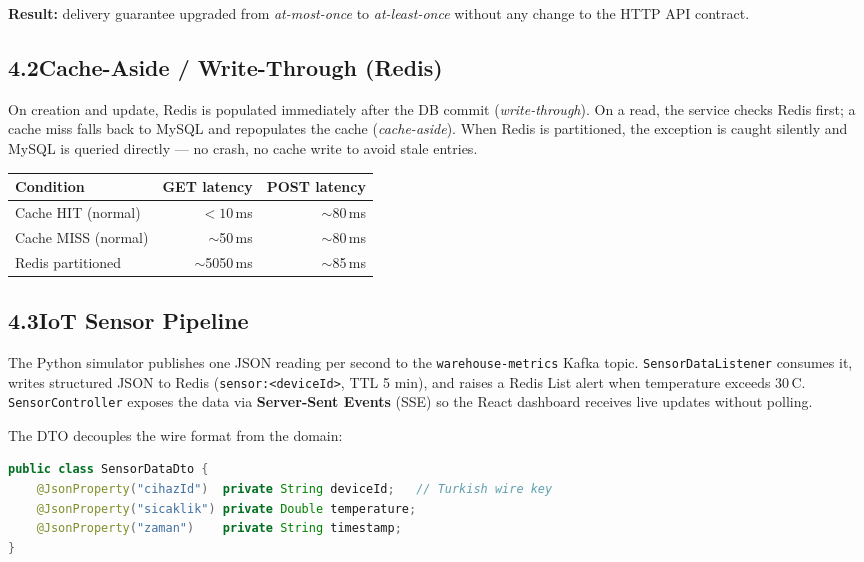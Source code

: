 \documentclass[11pt,a4paper]{article}
\begin{document}
\smallskip
\noindent\textbf{Result:} delivery guarantee upgraded from
\emph{at-most-once} to \emph{at-least-once} without any change to the
HTTP API contract.

\subsection*{4.2\quad Cache-Aside / Write-Through (Redis)}

On creation and update, Redis is populated immediately after the DB commit
(\emph{write-through}).
On a read, the service checks Redis first; a cache miss falls back to MySQL
and repopulates the cache (\emph{cache-aside}).
When Redis is partitioned, the exception is caught silently and MySQL is
queried directly --- no crash, no cache write to avoid stale entries.

\smallskip
\begin{center}
\small
\begin{tabular}{@{}lrr@{}}
\toprule
\textbf{Condition} & \textbf{GET latency} & \textbf{POST latency} \\
\midrule
Cache HIT (normal) & $<10$\,ms    & $\sim$80\,ms \\
Cache MISS (normal) & $\sim$50\,ms & $\sim$80\,ms \\
Redis partitioned & $\sim$5050\,ms & $\sim$85\,ms \\
\bottomrule
\end{tabular}
\end{center}

\subsection*{4.3\quad IoT Sensor Pipeline}

The Python simulator publishes one JSON reading per second to the
\texttt{warehouse-metrics} Kafka topic.
\texttt{SensorDataListener} consumes it, writes structured JSON to
Redis (\texttt{sensor:<deviceId>}, TTL 5 min), and raises a Redis List
alert when temperature exceeds 30\,\textdegree{}C.
\texttt{SensorController} exposes the data via \textbf{Server-Sent Events}
(SSE) so the React dashboard receives live updates without polling.

The DTO decouples the wire format from the domain:

\begin{lstlisting}[style=plain, language=Java]
public class SensorDataDto {
    @JsonProperty("cihazId")  private String deviceId;   // Turkish wire key
    @JsonProperty("sicaklik") private Double temperature;
    @JsonProperty("zaman")    private String timestamp;
}
\end{lstlisting}
\end{document}
